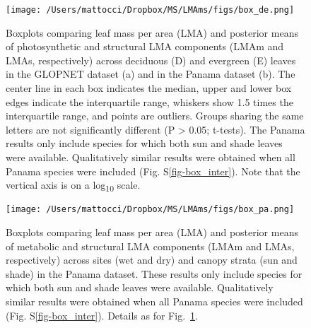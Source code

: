 \documentclass[
  12pt,
  a4paper,
,tablecaptionabove
]{scrartcl}
\begin{document}
\newpage

\begin{figure}

{\centering \texttt{[image: /Users/mattocci/Dropbox/MS/LMAms/figs/box\_de.png]}

}

\caption{\label{fig-boxplt_de}Boxplots comparing leaf mass per area
(LMA) and posterior means of photosynthetic and structural LMA
components (LMAm and LMAs, respectively) across deciduous (D) and
evergreen (E) leaves in the GLOPNET dataset (a) and in the Panama
dataset (b). The center line in each box indicates the median, upper and
lower box edges indicate the interquartile range, whiskers show 1.5
times the interquartile range, and points are outliers. Groups sharing
the same letters are not significantly different (P \textgreater{} 0.05;
t-tests). The Panama results only include species for which both sun and
shade leaves were available. Qualitatively similar results were obtained
when all Panama species were included (Fig. S\ref{fig-box_inter}). Note
that the vertical axis is on a log\textsubscript{10} scale.}

\end{figure}

\newpage

\begin{figure}

{\centering \texttt{[image: /Users/mattocci/Dropbox/MS/LMAms/figs/box\_pa.png]}

}

\caption{\label{fig-boxplt_pa}Boxplots comparing leaf mass per area
(LMA) and posterior means of metabolic and structural LMA components
(LMAm and LMAs, respectively) across sites (wet and dry) and canopy
strata (sun and shade) in the Panama dataset. These results only include
species for which both sun and shade leaves were available.
Qualitatively similar results were obtained when all Panama species were
included (Fig. S\ref{fig-box_inter}). Details as for
Fig.~\ref{fig-boxplt_de}.}

\end{figure}

\newpage
\end{document}
